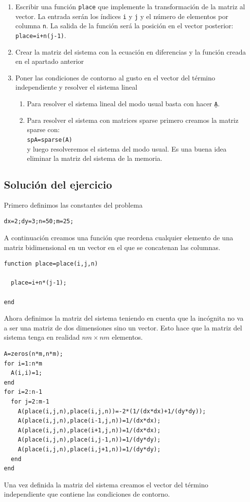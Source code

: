 \begin{enumerate}
\item Escribir una función \texttt{place} que implemente la transformación
de la matriz al vector. La entrada serán los índices \texttt{i} y
\texttt{j} y el número de elementos por columna \texttt{n}. La salida
de la función será la posición en el vector posterior: \texttt{place=i+n(j-1)}.
\item Crear la matriz del sistema con la ecuación en diferencias y la función
creada en el apartado anterior
\item Poner las condiciones de contorno al gusto en el vector del término
independiente y resolver el sistema lineal

\begin{enumerate}
\item Para resolver el sistema lineal del modo usual basta con hacer
  \texttt{A\b}.
\item Para resolver el sistema con matrices sparse primero creamos la
  matriz
  sparse con:\\
  \texttt{spA=sparse(A)}~\\
  y luego resolveremos el sistema del modo usual. Es una buena idea
  eliminar la matriz del sistema de la memoria.
\end{enumerate}
\end{enumerate}

\subsection{Solución del ejercicio}

Primero definimos las constantes del problema

  \begin{verbatim}
dx=2;dy=3;n=50;m=25;
\end{verbatim}
A continuación creamos una función que reordena cualquier elemento de
una matriz bidimensional en un vector en el que se concatenan las
columnas.

  \begin{verbatim}
function place=place(i,j,n)

  place=i+n*(j-1);

end
\end{verbatim}
Ahora definimos la matriz del sistema teniendo en cuenta que la
incógnita no va a ser una matriz de dos dimensiones sino un vector.
Esto hace que la matriz del sistema tenga en realidad $nm\times nm$
elementos.

  \begin{verbatim}
A=zeros(n*m,n*m);
for i=1:n*m
  A(i,i)=1;
end
for i=2:n-1
  for j=2:m-1
    A(place(i,j,n),place(i,j,n))=-2*(1/(dx*dx)+1/(dy*dy));
    A(place(i,j,n),place(i-1,j,n))=1/(dx*dx);
    A(place(i,j,n),place(i+1,j,n))=1/(dx*dx);
    A(place(i,j,n),place(i,j-1,n))=1/(dy*dy);
    A(place(i,j,n),place(i,j+1,n))=1/(dy*dy);
  end
end
\end{verbatim}
Una vez definida la matriz del sistema creamos el vector del término
independiente que contiene las condiciones de contorno.

